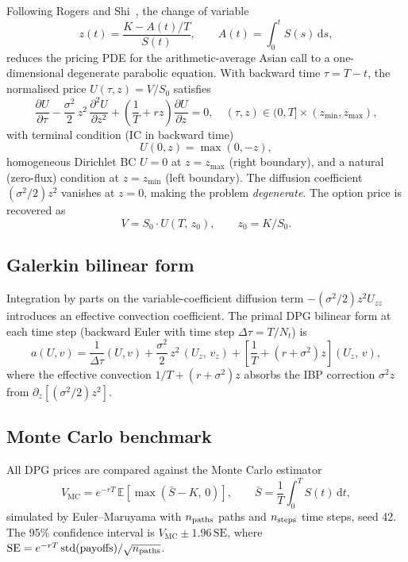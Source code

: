 \documentclass[11pt,a4paper]{article}
\newcommand{\Nt}{N_t}
\newcommand{\MC}{\mathrm{MC}}
\begin{document}
Following Rogers and Shi~\cite{rs1995}, the change of variable
\[
  z(t) = \frac{K - A(t)/T}{S(t)},
  \qquad
  A(t) = \int_0^t S(s)\,\mathrm{d}s,
\]
reduces the pricing PDE for the arithmetic-average Asian call to a
one-dimensional degenerate parabolic equation.  With backward time
$\tau = T - t$, the normalised price $U(\tau, z) = V/S_0$ satisfies
\begin{equation}
  \frac{\partial U}{\partial\tau}
  - \frac{\sigma^2}{2}\,z^2\,\frac{\partial^2 U}{\partial z^2}
  + \left(\frac{1}{T} + rz\right)\frac{\partial U}{\partial z} = 0,
  \quad
  (\tau, z) \in (0, T] \times (z_{\min}, z_{\max}),
  \label{eq:pde}
\end{equation}
with terminal condition (IC in backward time)
\begin{equation}
  U(0, z) = \max(0, -z),
  \label{eq:ic}
\end{equation}
homogeneous Dirichlet BC $U = 0$ at $z = z_{\max}$ (right boundary), and
a natural (zero-flux) condition at $z = z_{\min}$ (left boundary).
The diffusion coefficient $(\sigma^2/2)z^2$ vanishes at $z = 0$, making
the problem \emph{degenerate}.  The option price is recovered as
\[
  V = S_0 \cdot U(T,\, z_0), \qquad z_0 = K/S_0.
\]

\subsection{Galerkin bilinear form}

Integration by parts on the variable-coefficient diffusion term
$-(\sigma^2/2)z^2 U_{zz}$ introduces an effective convection coefficient.
The primal DPG bilinear form at each time step (backward Euler with
time step $\Delta\tau = T/\Nt$) is
\[
  a(U, v)
  = \frac{1}{\Delta\tau}(U, v)
  + \frac{\sigma^2}{2}\,z^2\,(U_z,\, v_z)
  + \left[\frac{1}{T} + (r + \sigma^2)z\right](U_z,\, v),
\]
where the effective convection $1/T + (r+\sigma^2)z$ absorbs the
IBP correction $\sigma^2 z$ from $\partial_z[(\sigma^2/2)z^2]$.

\subsection{Monte Carlo benchmark}

All DPG prices are compared against the Monte Carlo estimator
\begin{equation}
  V_{\MC} = e^{-rT}\,\mathbb{E}\!\left[\max\!\left(\bar{S} - K,\, 0\right)\right],
  \qquad
  \bar{S} = \frac{1}{T}\int_0^T S(t)\,\mathrm{d}t,
  \label{eq:mc}
\end{equation}
simulated by Euler--Maruyama with $n_{\rm paths}$ paths and
$n_{\rm steps}$ time steps, seed 42.  The 95\% confidence interval is
$V_{\MC} \pm 1.96\,\mathrm{SE}$, where
$\mathrm{SE} = e^{-rT}\,\mathrm{std}(\text{payoffs})/\sqrt{n_{\rm paths}}$.
\end{document}
